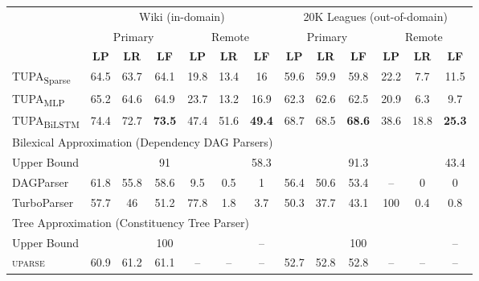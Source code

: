 \documentclass[11pt,a4paper]{article}
\newcommand{\parser}[1]{TUPA\textsubscript{#1}}
\begin{document}
\begin{table*}
	\begin{tabular}{l|ccc|ccc||ccc|ccc}
		& \multicolumn{6}{c||}{Wiki (in-domain)} & \multicolumn{6}{c}{20K Leagues (out-of-domain)} \\
		& \multicolumn{3}{c|}{Primary} & \multicolumn{3}{c||}{Remote}
		& \multicolumn{3}{c|}{Primary} & \multicolumn{3}{c}{Remote} \\
		& \textbf{LP} & \textbf{LR} & \textbf{LF} & \textbf{LP} & \textbf{LR} & \textbf{LF}
		& \textbf{LP} & \textbf{LR} & \textbf{LF} & \textbf{LP} & \textbf{LR} & \textbf{LF} \\
		\hline
		\parser{Sparse}
		& 64.5 & 63.7 & 64.1 & 19.8 & 13.4 & 16
		& 59.6 & 59.9 & 59.8 & 22.2 & 7.7 & 11.5 \\
		\parser{MLP}
		& 65.2 & 64.6 & 64.9 & 23.7 & 13.2 & 16.9
		& 62.3 & 62.6 & 62.5 & 20.9 & 6.3 & 9.7 \\
		\parser{BiLSTM}
		& 74.4 & 72.7 & \textbf{73.5} & 47.4 & 51.6 & \textbf{49.4}
		& 68.7 & 68.5 & \textbf{68.6} & 38.6 & 18.8 & \textbf{25.3} \\
		\hline
		\multicolumn{8}{l}{\rule{0pt}{2ex} \footnotesize
		Bilexical Approximation (Dependency DAG Parsers)} \\
		\small Upper Bound
		& & & \small 91 & & & \small 58.3
		& & & \small 91.3 & & & \small 43.4 \\
		DAGParser
		& 61.8 & 55.8 & 58.6 & 9.5 & 0.5 & 1
		& 56.4 & 50.6 & 53.4 & -- & 0 & 0 \\
		TurboParser
		& 57.7 & 46 & 51.2 & 77.8 & 1.8 & 3.7
		& 50.3 & 37.7 & 43.1 & 100 & 0.4 & 0.8 \\
		\hline
		\multicolumn{8}{l}{\rule{0pt}{2ex} \footnotesize
		Tree Approximation (Constituency Tree Parser)} \\
		\small Upper Bound
		& & & \small 100 & & & \small --
		& & & \small 100 & & & \small -- \\
		\textsc{uparse}
		& 60.9 & 61.2 & 61.1 & -- & -- & --
		& 52.7 & 52.8 & 52.8 & -- & -- & -- \\

\end{tabular}
\end{table*}
\end{document}
